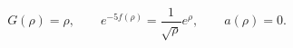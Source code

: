 \begin{equation}
G(\rho)= \rho, \qquad e^{-5 f(\rho)}=\frac{1}{\sqrt{\rho}}e^{\rho}, \qquad a(\rho)=0.
\end{equation}

